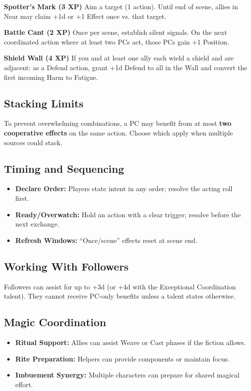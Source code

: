 \textbf{Spotter's Mark (3 XP)} Aim a target (1 action). Until end of scene, allies in Near may claim +1d or +1 Effect once vs. that target.

\textbf{Battle Cant (2 XP)} Once per scene, establish silent signals. On the next coordinated action where at least two PCs act, those PCs gain +1 Position.

\textbf{Shield Wall (4 XP)} If you and at least one ally each wield a shield and are adjacent: as a Defend action, grant +1d Defend to all in the Wall and convert the first incoming Harm to Fatigue.

\subsection{Stacking Limits}
To prevent overwhelming combinations, a PC may benefit from at most \textbf{two cooperative effects} on the same action. Choose which apply when multiple sources could stack.

\subsection{Timing and Sequencing}
\begin{itemize}
  \item \textbf{Declare Order:} Players state intent in any order; resolve the acting roll first.
  \item \textbf{Ready/Overwatch:} Hold an action with a clear trigger; resolve before the next exchange.
  \item \textbf{Refresh Windows:} ``Once/scene'' effects reset at scene end.
\end{itemize}

\subsection{Working With Followers}
Followers can assist for up to +3d (or +4d with the Exceptional Coordination talent). They cannot receive PC-only benefits unless a talent states otherwise.

\subsection{Magic Coordination}
\begin{itemize}
  \item \textbf{Ritual Support:} Allies can assist Weave or Cast phases if the fiction allows.
  \item \textbf{Rite Preparation:} Helpers can provide components or maintain focus.
  \item \textbf{Imbuement Synergy:} Multiple characters can prepare for shared magical effort.
\end{itemize}

